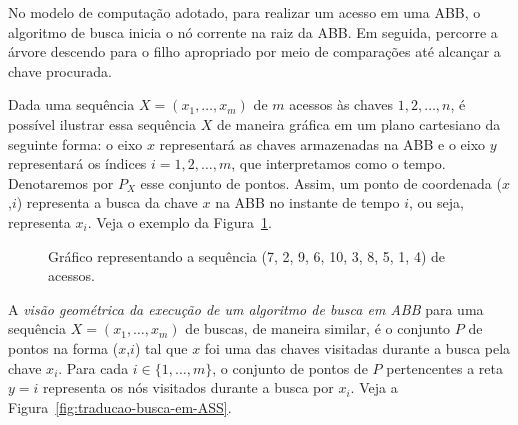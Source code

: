 No modelo de computação adotado, para realizar um acesso em uma ABB, o algoritmo de busca inicia o nó corrente na raiz da ABB. Em seguida, percorre a árvore descendo para o filho apropriado por meio de comparações até alcançar a chave procurada.

Dada uma sequência $X = (x_{1},\ldots,x_{m})$ de $m$ acessos às chaves $1,2,\ldots,n$, é possível ilustrar essa sequência $X$ de maneira gráfica em um plano cartesiano da seguinte forma: o eixo $x$ representará as chaves armazenadas na ABB e o eixo $y$ representará os índices $i = 1,2,\ldots,m$, que interpretamos como o tempo. Denotaremos por $P_X$ esse conjunto de pontos. Assim, um ponto de coordenada ($x$,$i$) representa a busca da chave $x$ na ABB no instante de tempo $i$, ou seja, representa $x_i$. Veja o exemplo da Figura~\ref{fig:busca_padrao}.

\begin{figure}
    \caption{Gráfico representando a sequência (7, 2, 9, 6, 10, 3, 8, 5, 1, 4) de acessos.}
\label{fig:busca_padrao}
\end{figure}

A \textit{visão geométrica da execução de um algoritmo de busca em ABB} para uma sequência $X = (x_{1},\ldots,x_{m})$ de buscas, de maneira similar, é o conjunto $P$ de pontos na forma ($x$,$i$) tal que $x$ foi uma das chaves visitadas durante a busca pela chave $x_i$. Para cada $i \in \{1,\ldots,m\}$, o conjunto de pontos de $P$ pertencentes a reta $y = i$ representa os nós visitados durante a busca por $x_i$. Veja a Figura~\ref{fig:traducao-busca-em-ASS}.

